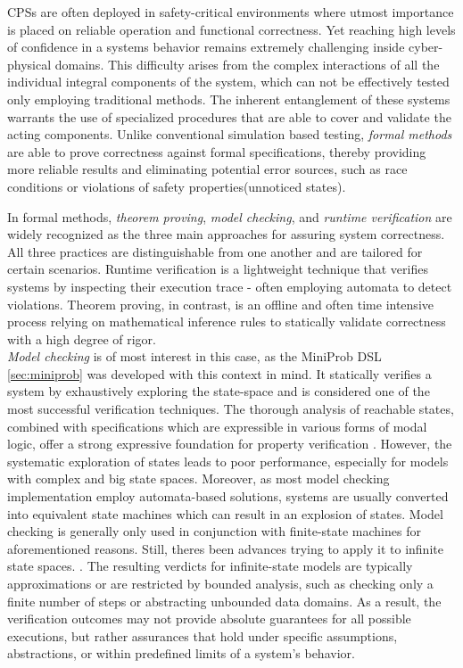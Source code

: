 CPSs are often deployed in safety-critical environments where utmost importance is placed on reliable operation and functional correctness. Yet reaching high levels of confidence
in a systems behavior remains extremely challenging inside cyber-physical domains.\cite{formalMethodsCPSCritical} This difficulty arises from the complex interactions of all the individual integral
components of the system, which can not be effectively tested only employing traditional methods. The inherent entanglement of these systems warrants the use of
specialized procedures that are able to cover and validate the acting components. Unlike conventional simulation based testing, \textit{formal methods} are able to prove correctness against
formal specifications, thereby providing more reliable results and eliminating potential error sources, such as race conditions or violations of safety properties(unnoticed states).

In formal methods, \textit{theorem proving}, \textit{model checking}, and \textit{runtime verification} are widely recognized as the three main approaches for assuring
system correctness\cite{formalMethodsBig3,formalMethodsCPSCritical}.
All three practices are distinguishable from one another and are tailored for certain scenarios. Runtime verification is a lightweight technique that verifies systems
by inspecting their execution trace - often employing automata to detect violations. Theorem proving, in contrast, is an offline and often time intensive
process relying on mathematical inference rules to statically validate correctness with a high degree of rigor.\\

\textit{Model checking} is of most interest in this case, as the MiniProb DSL \ref{sec:miniprob} was developed with this context in mind. \cite{POPACheck}
It statically verifies a system by exhaustively exploring the state-space and is considered one of the most successful verification techniques. \cite{formalMethodsCPSCritical}
The thorough analysis of reachable states, combined with specifications which are expressible in various forms of modal logic,
offer a strong expressive foundation for property verification \cite{modelCheckingPrinceples}. However, the systematic exploration of states leads to poor performance, especially for models with
complex and big state spaces. Moreover, as most model checking implementation employ automata-based solutions, systems are usually converted into
equivalent state machines which can result in an explosion of states.\cite{}
Model checking is generally only used in conjunction with finite-state machines for aforementioned reasons. Still, theres been advances trying to apply it to infinite state spaces.
\cite{modelCheckingInfCounter,modelCheckingInfSymb}. The resulting verdicts for infinite-state models are typically approximations or are restricted by bounded analysis,
such as checking only a finite number of steps or abstracting unbounded data domains. As a result, the verification outcomes may not provide absolute guarantees for all
possible executions, but rather assurances that hold under specific assumptions, abstractions, or within predefined limits of a system's behavior.


